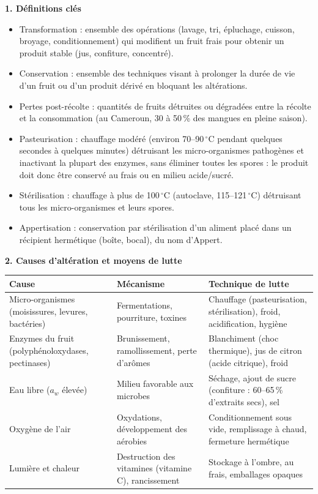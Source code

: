 \documentclass[11pt]{article}
\newcommand{\cle}[1]{{\popxbold\color{popdark}#1}}
\newcounter{popsec}
\newcounter{popsub}
\newcommand{\courssub}[1]{%
  \stepcounter{popsub}%
  \par\vspace{9pt}\noindent{\popxbold\fontsize{11.5}{13}\selectfont\color{popink}{\color{poporange}\thepopsec.\thepopsub}\hspace{6pt}#1}\par\nopagebreak\vspace{4pt}
}
\begin{document}
\courssub{L'essentiel à retenir}

\begin{aretenir}
\textbf{1. Définitions clés}
\begin{itemize}
  \item \cle{Transformation} : ensemble des opérations (lavage, tri, épluchage, cuisson, broyage, conditionnement) qui modifient un fruit frais pour obtenir un produit stable (jus, confiture, concentré).
  \item \cle{Conservation} : ensemble des techniques visant à prolonger la durée de vie d'un fruit ou d'un produit dérivé en bloquant les altérations.
  \item \cle{Pertes post-récolte} : quantités de fruits détruites ou dégradées entre la récolte et la consommation (au Cameroun, 30 à 50\,\% des mangues en pleine saison).
  \item \cle{Pasteurisation} : chauffage modéré (environ 70--90\,$^\circ$C pendant quelques secondes à quelques minutes) détruisant les micro-organismes pathogènes et inactivant la plupart des enzymes, sans éliminer toutes les spores : le produit doit donc être conservé au frais ou en milieu acide/sucré.
  \item \cle{Stérilisation} : chauffage à plus de 100\,$^\circ$C (autoclave, 115--121\,$^\circ$C) détruisant tous les micro-organismes et leurs spores.
  \item \cle{Appertisation} : conservation par stérilisation d'un aliment placé dans un récipient hermétique (boîte, bocal), du nom d'Appert.
\end{itemize}

\textbf{2. Causes d'altération et moyens de lutte}
\begin{center}
\begin{tabularx}{\linewidth}{|l|X|X|}
\hline
\rowcolor{popblueL} \textbf{Cause} & \textbf{Mécanisme} & \textbf{Technique de lutte} \\
\hline
Micro-organismes (moisissures, levures, bactéries) & Fermentations, pourriture, toxines & Chauffage (pasteurisation, stérilisation), froid, acidification, hygiène \\
\hline
Enzymes du fruit (polyphénoloxydases, pectinases) & Brunissement, ramollissement, perte d'arômes & Blanchiment (choc thermique), jus de citron (acide citrique), froid \\
\hline
Eau libre ($a_w$ élevée) & Milieu favorable aux microbes & Séchage, ajout de sucre (confiture : 60--65\,\% d'extraits secs), sel \\
\hline
Oxygène de l'air & Oxydations, développement des aérobies & Conditionnement sous vide, remplissage à chaud, fermeture hermétique \\
\hline
Lumière et chaleur & Destruction des vitamines (vitamine C), rancissement & Stockage à l'ombre, au frais, emballages opaques \\
\hline
\end{tabularx}
\end{center}


\end{aretenir}
\end{document}
